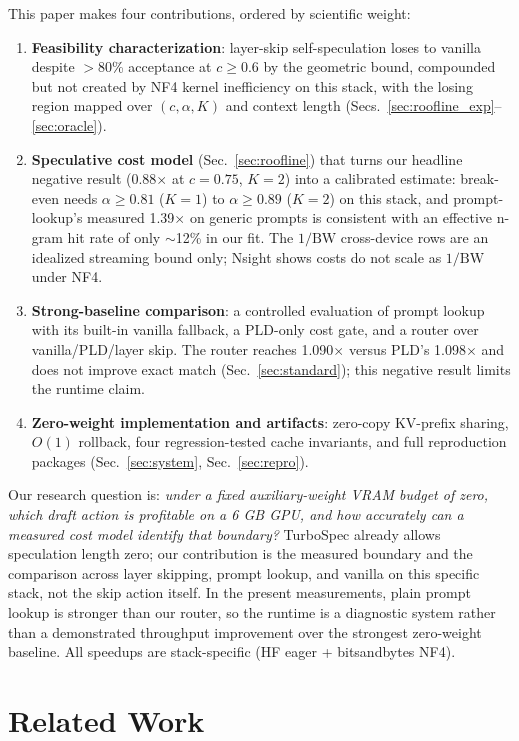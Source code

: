 \documentclass[10pt,twocolumn,letterpaper]{article}
\begin{document}
This paper makes four contributions, ordered by scientific weight:
\begin{enumerate}
\item \textbf{Feasibility characterization}: layer-skip self-speculation loses to vanilla despite $>$80\% acceptance at $c{\ge}0.6$ by the geometric bound, compounded but not created by NF4 kernel inefficiency on this stack, with the losing region mapped over $(c,\alpha,K)$ and context length (Secs.~\ref{sec:roofline_exp}--\ref{sec:oracle}).
\item \textbf{Speculative cost model} (Sec.~\ref{sec:roofline}) that turns our headline negative result (0.88$\times$ at $c{=}0.75$, $K{=}2$) into a calibrated estimate: break-even needs $\alpha{\ge}0.81$ ($K{=}1$) to $\alpha{\ge}0.89$ ($K{=}2$) on this stack, and prompt-lookup's measured 1.39$\times$ on generic prompts is consistent with an effective n-gram hit rate of only $\sim$12\% in our fit. The $1/\mathrm{BW}$ cross-device rows are an idealized streaming bound only; Nsight shows costs do not scale as $1/\mathrm{BW}$ under NF4.
\item \textbf{Strong-baseline comparison}: a controlled evaluation of prompt lookup with its built-in vanilla fallback, a PLD-only cost gate, and a router over vanilla/PLD/layer skip. The router reaches 1.090$\times$ versus PLD's 1.098$\times$ and does not improve exact match (Sec.~\ref{sec:standard}); this negative result limits the runtime claim.
\item \textbf{Zero-weight implementation and artifacts}: zero-copy KV-prefix sharing, $O(1)$ rollback, four regression-tested cache invariants, and full reproduction packages (Sec.~\ref{sec:system}, Sec.~\ref{sec:repro}).
\end{enumerate}

Our research question is: \textit{under a fixed auxiliary-weight VRAM budget of zero, which draft action is profitable on a 6 GB GPU, and how accurately can a measured cost model identify that boundary?} TurboSpec already allows speculation length zero; our contribution is the measured boundary and the comparison across layer skipping, prompt lookup, and vanilla on this specific stack, not the skip action itself. In the present measurements, plain prompt lookup is stronger than our router, so the runtime is a diagnostic system rather than a demonstrated throughput improvement over the strongest zero-weight baseline. All speedups are stack-specific (HF eager + bitsandbytes NF4).

\section{Related Work}
\label{sec:related}
\end{document}
